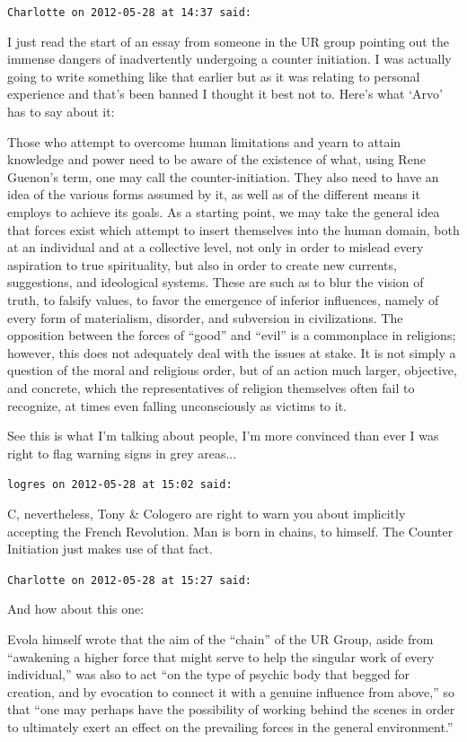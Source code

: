 \begin{footnotesize}
\begin{sffamily}
\hfill

\texttt{Charlotte on 2012-05-28 at 14:37 said:}

I just read the start of an essay from someone in the UR group pointing out the immense dangers of inadvertently undergoing a counter initiation. I was actually going to write something like that earlier but as it was relating to personal experience and that's been banned I thought it best not to. Here's what `Arvo' has to say about it:

Those who attempt to overcome human limitations and yearn to attain knowledge and power need to be aware of the existence of what, using Rene Guenon's term, one may call the counter-initiation. They also need to have an idea of the various forms assumed by it, as well as of the different means it employs to achieve its goals. As a starting point, we may take the general idea that forces exist which attempt to insert themselves into the human domain, both at an individual and at a collective level, not only in order to mislead every aspiration to true spirituality, but also in order to create new currents, suggestions, and ideological systems. These are such as to blur the vision of truth, to falsify values, to favor the emergence of inferior influences, namely of every form of materialism, disorder, and subversion in civilizations. The opposition between the forces of ``good'' and ``evil'' is a commonplace in religions; however, this does not adequately deal with the issues at stake. It is not simply a question of the moral and religious order, but of an action much larger, objective, and concrete, which the representatives of religion themselves often fail to recognize, at times even falling unconsciously as victims to it.

See this is what I'm talking about people, I'm more convinced than ever I was right to flag warning signs in grey areas... 

\hfill

\texttt{logres on 2012-05-28 at 15:02 said:}

C, nevertheless, Tony \& Cologero are right to warn you about implicitly accepting the French Revolution. Man is born in chains, to himself. The Counter Initiation just makes use of that fact.

\hfill

\texttt{Charlotte on 2012-05-28 at 15:27 said:}

And how about this one:

Evola himself wrote that the aim of the ``chain'' of the UR Group, aside from ``awakening a higher force that might serve to help the singular work of every individual,'' was also to act ``on the type of psychic body that begged for creation, and by evocation to connect it with a genuine influence from above,'' so that ``one may perhaps have the possi\-bility of working behind the scenes in order to ultimately exert an effect on the prevailing forces in the general environment.''


\end{sffamily}
\end{footnotesize}
